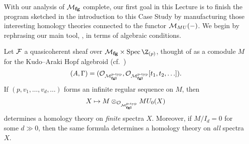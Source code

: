 With our analysis of $\mathcal{M}_{\mathbf{fg}}$ complete, our first goal in this Lecture is to finish the program sketched in the introduction to this Case Study by manufacturing those interesting homology theories connected to the functor $\mathcal{M}_{MU}(-)$.  We begin by rephrasing our main tool, , in terms of algebraic conditions.
\begin{theorem}\label{LEFTRealTheoremWithProof}
Let $\mathcal{F}$ a quasicoherent sheaf over $\moduli{fg} \times \Spec \Z_{(p)}$, thought of as a comodule $M$ for the Kudo--Araki Hopf algebroid (cf.\ ) \[(A, \Gamma) = (\mathcal{O}_{\mathcal{M}_{\mathbf{fgl}}^{p\text{-}\mathrm{typ}}}, \mathcal{O}_{\mathcal{M}_{\mathbf{fgl}}^{p\text{-}\mathrm{typ}}}[t_1, t_2, \ldots]).\]  If $(p, v_1, \ldots, v_d, \ldots)$ forms an infinite regular sequence on $M$, then \[X \mapsto M \otimes_{\mathcal{O}_{\mathcal{M}_{\mathbf{fgl}}^{p\text{-}\mathrm{typ}}}} MU_0(X)\] determines a homology theory on \emph{finite} spectra $X$.  Moreover, if $M/I_d = 0$ for some $d \gg 0$, then the same formula determines a homology theory on \emph{all} spectra $X$.
\end{theorem}
